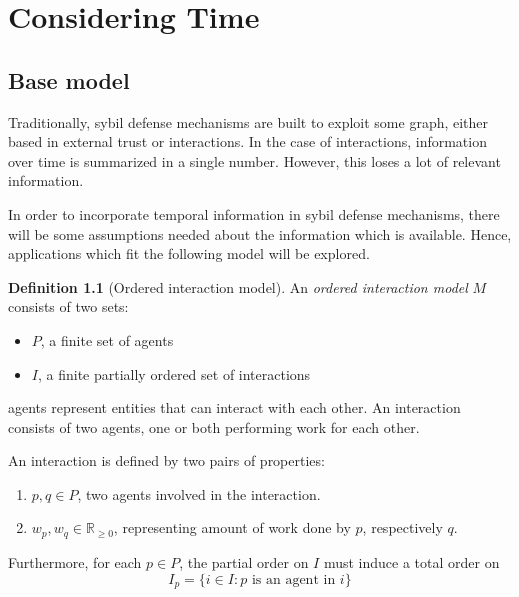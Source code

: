 \documentclass[a4paper,11pt]{book}
\newcommand{\bb}{\mathbb}
\theoremstyle{definition}
\newtheorem{definition}{Definition}
\begin{document}
\chapter{Considering Time}


\section{Base model}

Traditionally, sybil defense mechanisms are built to exploit some graph,
either based in external trust or interactions. In the case of interactions,
information over time is summarized in a single number. However, this loses
a lot of relevant information.

In order to incorporate temporal information in sybil defense mechanisms,
there will be some assumptions needed about the information which is available.
Hence, applications which fit the following model will be explored.

\begin{definition}[Ordered interaction model]
    An \emph{ordered interaction model} $M$ consists of two sets:  
    
    \begin{itemize}
        \item $P$, a finite set of agents
        \item $I$, a finite partially ordered set of interactions
    \end{itemize}

    agents represent entities that can interact with each other.
    An interaction consists of two agents, one or both performing
    work for each other. 
    
    An interaction is defined by two pairs of properties:
    \begin{enumerate}
        \item $p, q \in P$, two agents involved in the interaction.
        \item $w_p, w_q \in \bb{R}_{\geq0}$, representing amount of work done by $p$, respectively $q$.
    \end{enumerate}

    Furthermore, for each $p \in P$, the partial order on $I$ must induce a total order on 
    \begin{equation*}
        I_p = \{i \in I : p \mbox{ is an agent in } i\}
    \end{equation*}
\end{definition}
\end{document}
